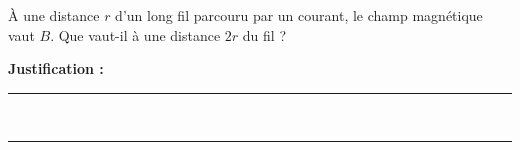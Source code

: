 À une distance $r$ d'un long fil parcouru par un courant, le champ magnétique vaut $B$. Que vaut-il à une distance $2r$ du fil ?

\choices

\noindent\textbf{Justification :} \hrulefill \\[2.5ex]
\rule{\linewidth}{0.4pt} \\[2.5ex]
\rule{\linewidth}{0.4pt}
\vfill
